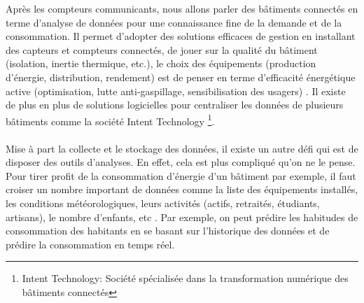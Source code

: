 \documentclass[11pt,a4paper]{report}
\begin{document}
Après les compteurs communicants, nous allons parler des bâtiments connectés en terme d'analyse de données pour une connaissance fine de la demande et de la consommation. Il permet d’adopter des solutions efficaces de gestion en installant des capteurs et compteurs connectés, de jouer sur la qualité du bâtiment (isolation, inertie thermique, etc.), le choix des équipements (production d’énergie, distribution, rendement) est de penser en terme d’efficacité énergétique active (optimisation, lutte anti-gaspillage, sensibilisation des usagers) \cite{batiment}. Il existe de plus en plus de solutions logicielles pour centraliser les données de plusieurs bâtiments comme la société Intent Technology \footnote{Intent Technology: Société spécialisée dans la transformation numérique des bâtiments connectés}.\\\\
 Mise à part la collecte et le stockage des données, il existe un autre défi qui est de disposer des outils d'analyses. En effet, cela est plus compliqué qu'on ne le pense. Pour tirer profit de la consommation d'énergie d'un bâtiment par exemple, il faut croiser un nombre important de données comme la liste des équipements installés, les conditions météorologiques, leurs activités (actifs, retraités, étudiants, artisans), le nombre d’enfants, etc \cite{batiment1}.
Par exemple, on peut prédire les habitudes de consommation des habitants en se basant sur l’historique des données et de prédire la consommation en temps réel.



%
%
\end{document}
